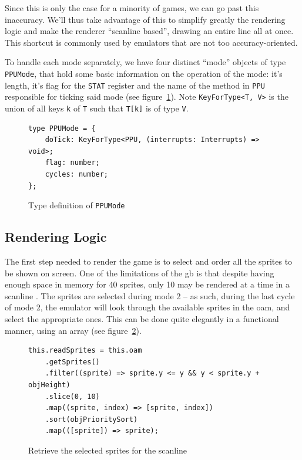 \documentclass[11pt]{informatics-report}
\begin{document}
Since this is only the case for a minority of games, we can go past this inaccuracy. We'll thus take advantage of this to simplify greatly the rendering logic and make the renderer ``scanline based'', drawing an entire line all at once. This shortcut is commonly used by emulators that are not too accuracy-oriented.

To handle each mode separately, we have four distinct ``mode'' objects of type \texttt{PPUMode}, that hold some basic information on the operation of the mode: it's length, it's flag for the \texttt{STAT} register and the name of the method in \texttt{PPU} responsible for ticking said mode (see figure~\ref{fig:stat-mode-type}). Note \texttt{KeyForType<T, V>} is the union of all keys \texttt{k} of \texttt{T} such that \texttt{T[k]} is of type \texttt{V}.


\begin{figure}[h]
    \begin{verbatim}
type PPUMode = {
    doTick: KeyForType<PPU, (interrupts: Interrupts) => void>;
    flag: number;
    cycles: number;
};
    \end{verbatim}
    \caption{Type definition of \texttt{PPUMode}}
    \label{fig:stat-mode-type}
\end{figure}

\subsection{Rendering Logic}

The first step needed to render the game is to select and order all the sprites to be shown on screen. One of the limitations of the \gls{gb} is that despite having enough space in memory for 40 sprites, only 10 may be rendered at a time in a scanline \cite[OAM]{pandoc}. The sprites are selected during mode 2 -- as such, during the last cycle of mode 2, the emulator will look through the available sprites in the \gls{oam}, and select the appropriate ones. This can be done quite elegantly in a functional manner, using an array (see figure~\ref{fig:sprite-select}).

\begin{figure}[h]
    \begin{verbatim}
this.readSprites = this.oam
    .getSprites()
    .filter((sprite) => sprite.y <= y && y < sprite.y + objHeight)
    .slice(0, 10)
    .map((sprite, index) => [sprite, index])
    .sort(objPrioritySort)
    .map(([sprite]) => sprite);
    \end{verbatim}
    \caption{Retrieve the selected sprites for the scanline}
    \label{fig:sprite-select}
\end{figure}
\end{document}
